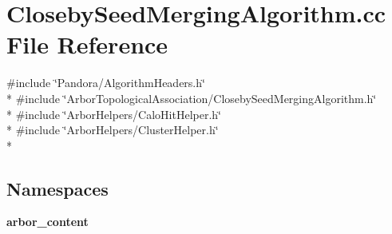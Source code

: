 \section{Closeby\+Seed\+Merging\+Algorithm.\+cc File Reference}
\label{ClosebySeedMergingAlgorithm_8cc}
{\ttfamily \#include \char`\"{}Pandora/\+Algorithm\+Headers.\+h\char`\"{}}\\*
{\ttfamily \#include \char`\"{}Arbor\+Topological\+Association/\+Closeby\+Seed\+Merging\+Algorithm.\+h\char`\"{}}\\*
{\ttfamily \#include \char`\"{}Arbor\+Helpers/\+Calo\+Hit\+Helper.\+h\char`\"{}}\\*
{\ttfamily \#include \char`\"{}Arbor\+Helpers/\+Cluster\+Helper.\+h\char`\"{}}\\*
\subsection*{Namespaces}
\begin{DoxyCompactItemize}
\item 
 {\bf arbor\+\_\+content}
\end{DoxyCompactItemize}
